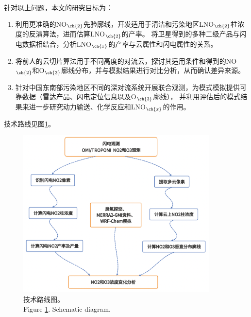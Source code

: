 针对以上问题，本文的研究目标为：

\begin{enumerate}[label=（\arabic*）, labelindent=\parindent, nosep, leftmargin=0pt, widest=0, itemindent=*, topsep=0pt, partopsep=0pt, parsep=0pt]

\item 利用更准确的NO$_{\ch{2}}$先验廓线，开发适用于清洁和污染地区LNO$_{\ch{2}}$柱浓度的反演算法，进而估算LNO$_{\ch{2}}$的产率。
将卫星得到的多种二级产品与闪电数据相结合，分析LNO$_{\ch{x}}$的产率与云属性和闪电属性的关系。

\item 将前人的云切片算法用于不同高度的对流云，探讨其适用条件和得到的NO$_{\ch{2}}$和O$_{\ch{3}}$廓线分布，并与模拟结果进行对比分析，从而确认差异来源。

\item 针对中国东南部污染地区不同的深对流系统开展联合观测，为模式模拟提供可靠数据（雷达产品、闪电定位信息以及O$_{\ch{3}}$廓线），
并利用评估后的模式结果来进一步研究动力输送、化学反应和LNO$_{\ch{x}}$的作用。

\end{enumerate}


技术路线见图\ref{figure:schematic_diagram}。

\begin{figure}[H]
\centering
\includegraphics[width=0.9\textwidth]{./figures/schematic_diagram.png}
\caption{技术路线图。\\
Figure \ref{figure:schematic_diagram}. Schematic diagram.
}
\label{figure:schematic_diagram}
\end{figure}

